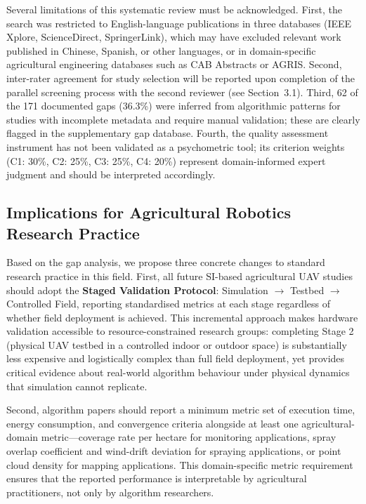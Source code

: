 \documentclass[review,3p,times]{elsarticle}
\begin{document}
Several limitations of this systematic review must be acknowledged. First, the search was restricted to English-language publications in three databases (IEEE Xplore, ScienceDirect, SpringerLink), which may have excluded relevant work published in Chinese, Spanish, or other languages, or in domain-specific agricultural engineering databases such as CAB Abstracts or AGRIS. Second, inter-rater agreement for study selection will be reported upon completion of the parallel screening process with the second reviewer (see Section~3.1). Third, 62 of the 171 documented gaps (36.3\%) were inferred from algorithmic patterns for studies with incomplete metadata and require manual validation; these are clearly flagged in the supplementary gap database. Fourth, the quality assessment instrument has not been validated as a psychometric tool; its criterion weights (C1: 30\%, C2: 25\%, C3: 25\%, C4: 20\%) represent domain-informed expert judgment and should be interpreted accordingly.

\subsection{Implications for Agricultural Robotics Research Practice}
\label{sec:implications}

Based on the gap analysis, we propose three concrete changes to standard research practice in this field. First, all future SI-based agricultural UAV studies should adopt the \textbf{Staged Validation Protocol}: Simulation $\rightarrow$ Testbed $\rightarrow$ Controlled Field, reporting standardised metrics at each stage regardless of whether field deployment is achieved. This incremental approach makes hardware validation accessible to resource-constrained research groups: completing Stage 2 (physical UAV testbed in a controlled indoor or outdoor space) is substantially less expensive and logistically complex than full field deployment, yet provides critical evidence about real-world algorithm behaviour under physical dynamics that simulation cannot replicate.

Second, algorithm papers should report a minimum metric set of execution time, energy consumption, and convergence criteria alongside at least one agricultural-domain metric---coverage rate per hectare for monitoring applications, spray overlap coefficient and wind-drift deviation for spraying applications, or point cloud density for mapping applications. This domain-specific metric requirement ensures that the reported performance is interpretable by agricultural practitioners, not only by algorithm researchers.
\end{document}
